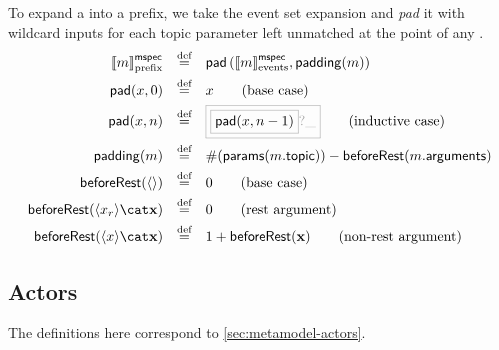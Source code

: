 \newcommand{\paramsOf}[1]{\funcname{params}(#1)}
\newcommand{\beforeRest}[1]{\funcname{beforeRest}(#1)}

\begin{defn}

To expand a \mmessagespec{} into a prefix, we take the event set expansion and
 \emph{pad} it with wildcard inputs for each topic parameter
left unmatched at the point of any \mrestargument.
%
\begin{align*}
	\pmspecsema{\amspec}
\quad\defeq\quad&
	\funcname{pad}\left(\emspecsema{\amspec}, \funcname{padding}(\amspec)\right)
\\
	\funcname{pad}(x, 0)
\quad\defeq\quad&
	x
\tag{base case}
\\
	\funcname{pad}(x, n)
\quad\defeq\quad&
\tlang{
	\olang{\funcname{pad}(x, n-1)}?\_
}
\tag{inductive case}
\\
	\funcname{padding}(\amspec)
\quad\defeq\quad&
	\#(\paramsOf{\field{\amspec}{topic}}) - \beforeRest{\field{\amspec}{arguments}}
\\
	\beforeRest{\langle\rangle}
\quad\defeq\quad&
	0
\tag{base case}
\\
	\beforeRest{\langle \arestarg \rangle \cat \anarglist}
\quad\defeq\quad&
	0
\tag{rest argument}
\\
	\beforeRest{\langle \anarg \rangle \cat \anarglist}
\quad\defeq\quad&
	1 + \beforeRest{\anarglist}
\tag{non-rest argument}
\end{align*}
\end{defn}

\subsection{Actors}\label{ssec:semantics-tockcsp-actors}

The definitions here correspond to \cref{sec:metamodel-actors}.


